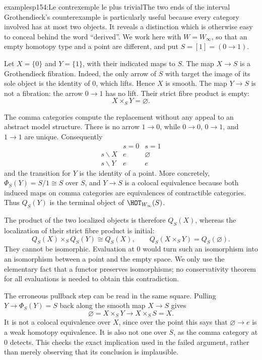 \begin{dcomment}{examples}{p154:Le contrexemple le plus trivial}{The two ends of the interval}
Grothendieck's counterexample is particularly useful because every category involved has at most two objects. It reveals a distinction which is otherwise easy to conceal behind the word ``derived''. We work here with $W=W_\infty$, so that an empty homotopy type and a point are different, and put $S=[1]=(0\to1)$.

Let $X=\{0\}$ and $Y=\{1\}$, with their indicated maps to $S$. The map $X\to S$ is a Grothendieck fibration. Indeed, the only arrow of $S$ with target the image of its sole object is the identity of $0$, which lifts. Hence $X$ is smooth. The map $Y\to S$ is not a fibration: the arrow $0\to1$ has no lift. Their strict fibre product is empty:
\[
 X\times_S Y=\varnothing.
\]

The comma categories compute the replacement without any appeal to an abstract model structure. There is no arrow $1\to0$, while $0\to0$, $0\to1$, and $1\to1$ are unique. Consequently
\[
\begin{array}{c|cc}
 &s=0&s=1\\ \hline
 s\backslash X& e&\varnothing\\
 s\backslash Y& e&e
\end{array}
\]
and the transition for $Y$ is the identity of a point. More concretely, $\Phi_S(Y)=S/1\cong S$ over $S$, and $Y\to S$ is a colocal equivalence because both induced maps on comma categories are equivalences of contractible categories. Thus $Q_S(Y)$ is the terminal object of $\HOT_{W_\infty}(S)$.

The product of the two localized objects is therefore $Q_S(X)$, whereas the localization of their strict fibre product is initial:
\[
 Q_S(X)\times_S Q_S(Y)\cong Q_S(X),\qquad
 Q_S(X\times_S Y)=Q_S(\varnothing).
\]
They cannot be isomorphic. Evaluation at $0$ would turn such an isomorphism into an isomorphism between a point and the empty space. We only use the elementary fact that a functor preserves isomorphisms; no conservativity theorem for all evaluations is needed to obtain this contradiction.

The erroneous pullback step can be read in the same square. Pulling $Y\to\Phi_S(Y)=S$ back along the smooth map $X\to S$ gives
\[
 \varnothing=X\times_S Y\longrightarrow X\times_S S=X.
\]
It is not a colocal equivalence over $X$, since over the point this says that $\varnothing\to e$ is a weak homotopy equivalence. It is also not one over $S$, as the comma category at $0$ detects. This checks the exact implication used in the failed argument, rather than merely observing that its conclusion is implausible.


\end{dcomment}
